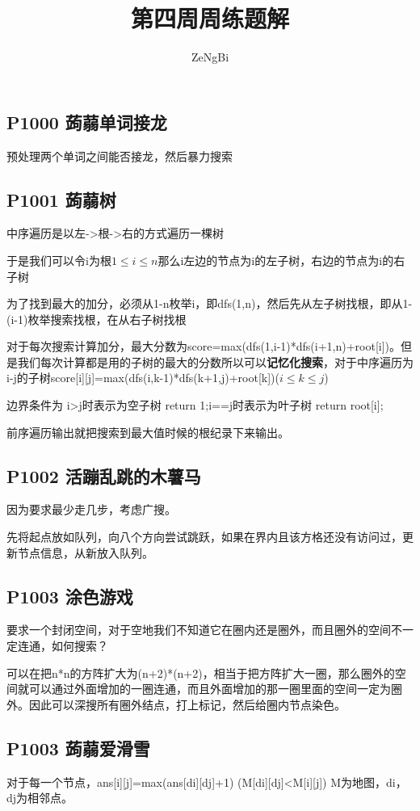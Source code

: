 \documentclass[UTF8]{ctexart}
\title{第四周周练题解}
\author{ZeNgBi}
\date{}
\begin{document}
	\maketitle
	\subsection*{P1000 蒟蒻单词接龙}
	预处理两个单词之间能否接龙，然后暴力搜索
	\subsection*{P1001 蒟蒻树}
	中序遍历是以左->根->右的方式遍历一棵树
	
	于是我们可以令i为根$1\le i\le n$那么i左边的节点为i的左子树，右边的节点为i的右子树
	
	为了找到最大的加分，必须从1-n枚举i，即dfs(1,n)，然后先从左子树找根，即从1-(i-1)枚举搜索找根，在从右子树找根
	
	对于每次搜索计算加分，最大分数为score=max(dfs(1,i-1)*dfs(i+1,n)+root[i])。但是我们每次计算都是用的子树的最大的分数所以可以\textbf{记忆化搜索}，对于中序遍历为i-j的子树score[i][j]=max(dfs(i,k-1)*dfs(k+1,j)+root[k])($i\le k\le j$)
	
	边界条件为 i>j时表示为空子树 return 1;i==j时表示为叶子树 return root[i];
	 
	前序遍历输出就把搜索到最大值时候的根纪录下来输出。
	\subsection*{P1002 活蹦乱跳的木薯马}
	因为要求最少走几步，考虑广搜。
	
	先将起点放如队列，向八个方向尝试跳跃，如果在界内且该方格还没有访问过，更新节点信息，从新放入队列。
	\subsection*{P1003 涂色游戏}
	要求一个封闭空间，对于空地我们不知道它在圈内还是圈外，而且圈外的空间不一定连通，如何搜索？
	
	可以在把n*n的方阵扩大为(n+2)*(n+2)，相当于把方阵扩大一圈，那么圈外的空间就可以通过外面增加的一圈连通，而且外面增加的那一圈里面的空间一定为圈外。因此可以深搜所有圈外结点，打上标记，然后给圈内节点染色。
	
	\subsection*{P1003 蒟蒻爱滑雪}
	对于每一个节点，ans[i][j]=max(ans[di][dj]+1) (M[di][dj]<M[i][j]) M为地图，di，dj为相邻点。
	
\end{document}
